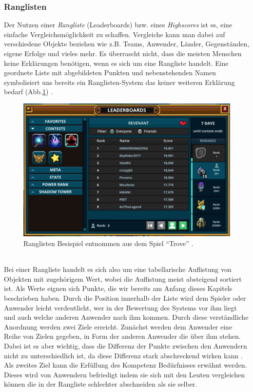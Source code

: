 \documentclass[a4paper,12pt]{scrartcl}
\begin{document}
\subsubsection{Ranglisten}
Der Nutzen einer \textit{Rangliste} (Leaderboards) bzw. eines \textit{Highscores} ist es, eine einfache Vergleichsmöglichkeit zu schaffen. Vergleiche kann man dabei auf verschiedene Objekte beziehen wie z.B. Teams, Anwender, Länder, Gegenständen, eigene Erfolge und vieles mehr. Es überrascht nicht, dass die meisten Menschen keine Erklärungen benötigen, wenn es sich um eine Rangliste handelt. Eine geordnete Liste mit abgebildeten Punkten und nebenstehenden Namen symbolisiert uns bereits ein Ranglisten-System das keiner weiteren Erklärung bedarf (Abb.\ref{RanglistenBild}) \cite{Zichermann2011}.
\\
\begin{figure}[h!]
\begin{center}
\includegraphics[scale = 0.3]{Bilder/Ranglisten.eps}
\caption{Ranglisten Besispiel entnommen aus dem Spiel \enquote{Trove} \cite{Leaderboards}.}
\label{RanglistenBild}
\end{center}
\end{figure} 
\\ 
Bei einer Rangliste handelt es sich also um eine tabellarische Auflistung von Objekten mit zugehörigem Wert, wobei die Auflistung meist absteigend sortiert ist. Als Werte eignen sich Punkte, die wir bereits am Anfang dieses Kapitels beschrieben haben. Durch die Position innerhalb der Liste wird dem Spieler oder Anwender leicht verdeutlicht, wer in der Bewertung des Systems vor ihm liegt und auch welche anderen Anwender nach ihm kommen. Durch diese verständliche Anordnung werden zwei Ziele erreicht. Zunächst werden dem Anwender eine Reihe von Zielen gegeben, in Form der anderen Anwender die über ihm stehen. Dabei ist es aber wichtig, dass die Differenz der Punkte zwischen den Anwendern nicht zu unterschiedlich ist, da diese Differenz stark abschreckend wirken kann \cite{Zichermann2011}. Als zweites Ziel kann die Erfüllung des Kompetenz Bedürfnisses erwähnt werden. Dieses wird von Anwendern befriedigt indem sie sich mit den Leuten vergleichen können die in der Rangliste schlechter abschneiden als sie selber. 
\end{document}

